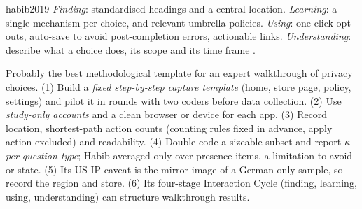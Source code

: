\begin{papercard}{habib2019}
 \emph{Finding}: standardised headings and a central location. \emph{Learning}: a single mechanism per choice, and relevant umbrella policies. \emph{Using}: one-click opt-outs, auto-save to avoid post-completion errors, actionable links. \emph{Understanding}: describe what a choice does, its scope and its time frame .

 Probably the best methodological template for an expert walkthrough of privacy choices. (1) Build a \emph{fixed step-by-step capture template} (home, store page, policy, settings) and pilot it in rounds with two coders before data collection. (2) Use \emph{study-only accounts} and a clean browser or device for each app. (3) Record location, shortest-path action counts (counting rules fixed in advance, apply action excluded) and readability. (4) Double-code a sizeable subset and report $\kappa$ \emph{per question type}; Habib averaged only over presence items, a limitation to avoid or state. (5) Its US-IP caveat is the mirror image of a German-only sample, so record the region and store. (6) Its four-stage Interaction Cycle (finding, learning, using, understanding) can structure walkthrough results.
\end{papercard}
